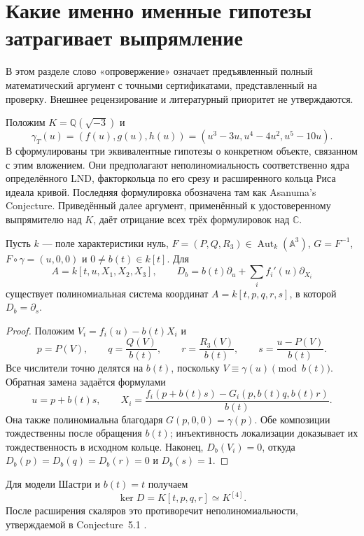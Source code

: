 \section{Какие именно именные гипотезы затрагивает выпрямление}

В этом разделе слово «опровержение» означает предъявленный полный
математический аргумент с точными сертификатами, представленный на проверку.
Внешнее рецензирование и литературный приоритет не утверждаются.

Положим $K=\mathbb Q(\sqrt{-3})$ и
\[
\gamma_T(u)=(f(u),g(u),h(u))
=(u^3-3u,u^4-4u^2,u^5-10u).
\]
В \cite[с.~1319--1320]{vdER} сформулированы три эквивалентные
гипотезы о конкретном объекте, связанном с этим вложением. Они
предполагают неполиномиальность соответственно ядра определённого LND,
факторкольца по его срезу и расширенного кольца Риса идеала кривой.
Последняя формулировка обозначена там как Asanuma's Conjecture.
Приведённый далее аргумент, применённый к удостоверенному выпрямителю
над $K$, даёт отрицание всех трёх формулировок над $\mathbb C$.

\begin{proposition}
Пусть $k$ --- поле характеристики нуль,
$F=(P,Q,R_3)\in\operatorname{Aut}_k(\mathbb A^3)$,
$G=F^{-1}$, $F\circ\gamma=(u,0,0)$ и $0\ne b(t)\in k[t]$.
Для
\[
A=k[t,u,X_1,X_2,X_3],\qquad
D_b=b(t)\partial_u+\sum_i f_i'(u)\partial_{X_i}
\]
существует полиномиальная система координат
$A=k[t,p,q,r,s]$, в которой $D_b=\partial_s$.
\end{proposition}

\begin{proof}
Положим $V_i=f_i(u)-b(t)X_i$ и
\[
p=P(V),\qquad q=\frac{Q(V)}{b(t)},\qquad
r=\frac{R_3(V)}{b(t)},\qquad
s=\frac{u-P(V)}{b(t)}.
\]
Все числители точно делятся на $b(t)$, поскольку
$V\equiv\gamma(u)\pmod{b(t)}$. Обратная замена задаётся формулами
\[
u=p+b(t)s,\qquad
X_i=\frac{f_i(p+b(t)s)-G_i(p,b(t)q,b(t)r)}{b(t)}.
\]
Она также полиномиальна благодаря $G(p,0,0)=\gamma(p)$.
Обе композиции тождественны после обращения $b(t)$; инъективность
локализации доказывает их тождественность в исходном кольце. Наконец,
$D_b(V_i)=0$, откуда $D_b(p)=D_b(q)=D_b(r)=0$ и $D_b(s)=1$.
\end{proof}

Для модели Шастри и $b(t)=t$ получаем
\[
\ker D=K[t,p,q,r]\simeq K^{[4]}.
\]
После расширения скаляров это противоречит неполиномиальности,
утверждаемой в Conjecture~5.1 \cite{vdER}.

